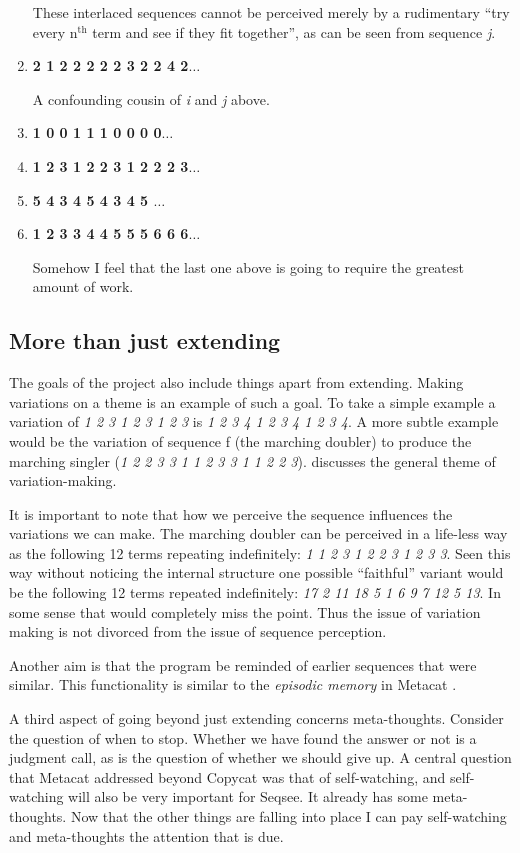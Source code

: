 \documentclass[letterpaper]{article}
\begin{document}
\begin{enumerate}
These interlaced sequences cannot be perceived merely by a rudimentary ``try every n$^\mathrm{th}$ term and see if they fit together'', as can be seen from sequence \emph{j}.

\item \textbf{ 2 1 2 2 2 2 2 3 2 2 4 2$\ldots$} \label{seq:k}

A confounding cousin of \emph{i} and \emph{j} above.

\item \textbf{ 1 0 0 1 1 1 0 0 0 0$\ldots$}
\item \textbf{ 1 2 3 1 2 2 3 1 2 2 2 3$\ldots$}
\item \textbf{ 5 4 3 4 5 4 3 4 5 $\ldots$}
\item \textbf{ 1 2 3 3 4 4 5 5 5 6 6 6$\ldots$}

Somehow I feel that the last one above is going to require the greatest amount of work.
\end{enumerate}

\subsection{More than just extending}
\label{sec:more}
The goals of the project also include things apart from extending.  Making variations on a theme is an example of such a goal.  To take a simple example a variation of \emph{1 2 3 1 2 3 1 2 3} is \emph{1 2 3 4 1 2 3 4 1 2 3 4}.  A more subtle example would be the variation of  sequence f (the marching doubler) to produce the marching singler (\emph{1 2 2 3 3 1 1 2 3 3 1 1 2 2 3}).  discusses the general theme of variation-making.

It is important to note that how we perceive the sequence influences the variations we can make.  The marching doubler can be perceived in a life-less way as the following 12 terms repeating indefinitely: \emph{1 1 2 3 1 2 2 3 1 2 3 3}.  Seen this way without noticing the internal structure one possible ``faithful'' variant would be the following 12 terms repeated indefinitely: \emph{17 2 11 18 5 1 6 9 7 12 5 13}. In some sense that would completely miss the point. Thus the issue of variation making is not divorced from the issue of sequence perception.

Another aim is that the program be reminded of earlier sequences that were similar.  This functionality is similar to the \emph{episodic memory} in Metacat \cite{Marshall}.

A third aspect of going beyond just extending concerns meta-thoughts.  Consider the question of when to stop.  Whether we have found the answer or not is a judgment call, as is the question of whether we should give up. A central question that Metacat addressed beyond Copycat was that of self-watching, and self-watching will also be very important for Seqsee. It already has some meta-thoughts. Now that the other things are falling into place I can pay self-watching and meta-thoughts the attention that is due. 
\end{document}
